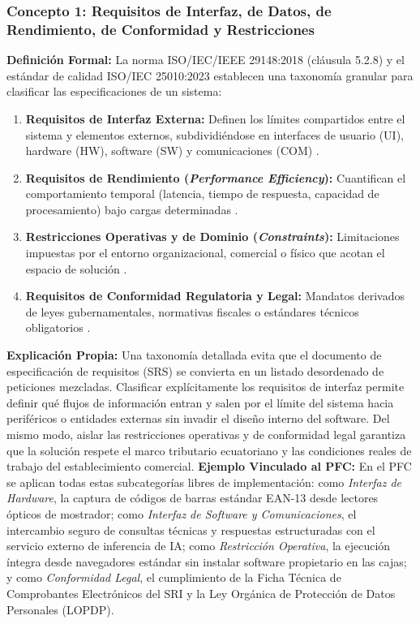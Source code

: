 \documentclass[conference,10pt]{IEEEtran}
\begin{document}
	\subsubsection{Concepto 1: Requisitos de Interfaz, de Datos, de Rendimiento, de Conformidad y Restricciones}
	\textbf{Definición Formal:} La norma ISO/IEC/IEEE 29148:2018 (cláusula 5.2.8) \cite{ieee29148} y el estándar de calidad ISO/IEC 25010:2023 \cite{iso25010} establecen una taxonomía granular para clasificar las especificaciones de un sistema:
	\begin{enumerate}
		\item \textbf{Requisitos de Interfaz Externa:} Definen los límites compartidos entre el sistema y elementos externos, subdividiéndose en interfaces de usuario (UI), hardware (HW), software (SW) y comunicaciones (COM) \cite{ieee29148}.
		\item \textbf{Requisitos de Rendimiento (\textit{Performance Efficiency}):} Cuantifican el comportamiento temporal (latencia, tiempo de respuesta, capacidad de procesamiento) bajo cargas determinadas \cite{iso25010}.
		\item \textbf{Restricciones Operativas y de Dominio (\textit{Constraints}):} Limitaciones impuestas por el entorno organizacional, comercial o físico que acotan el espacio de solución \cite{pohl2025, swebok2024}.
		\item \textbf{Requisitos de Conformidad Regulatoria y Legal:} Mandatos derivados de leyes gubernamentales, normativas fiscales o estándares técnicos obligatorios \cite{ieee29148, ireb2023}.
	\end{enumerate}
	\textbf{Explicación Propia:} Una taxonomía detallada evita que el documento de especificación de requisitos (SRS) se convierta en un listado desordenado de peticiones mezcladas. Clasificar explícitamente los requisitos de interfaz permite definir qué flujos de información entran y salen por el límite del sistema hacia periféricos o entidades externas sin invadir el diseño interno del software. Del mismo modo, aislar las restricciones operativas y de conformidad legal garantiza que la solución respete el marco tributario ecuatoriano y las condiciones reales de trabajo del establecimiento comercial.
	\textbf{Ejemplo Vinculado al PFC:} En el PFC se aplican todas estas subcategorías libres de implementación: como \textit{Interfaz de Hardware}, la captura de códigos de barras estándar EAN-13 desde lectores ópticos de mostrador; como \textit{Interfaz de Software y Comunicaciones}, el intercambio seguro de consultas técnicas y respuestas estructuradas con el servicio externo de inferencia de IA; como \textit{Restricción Operativa}, la ejecución íntegra desde navegadores estándar sin instalar software propietario en las cajas; y como \textit{Conformidad Legal}, el cumplimiento de la Ficha Técnica de Comprobantes Electrónicos del SRI y la Ley Orgánica de Protección de Datos Personales (LOPDP).
\end{document}
